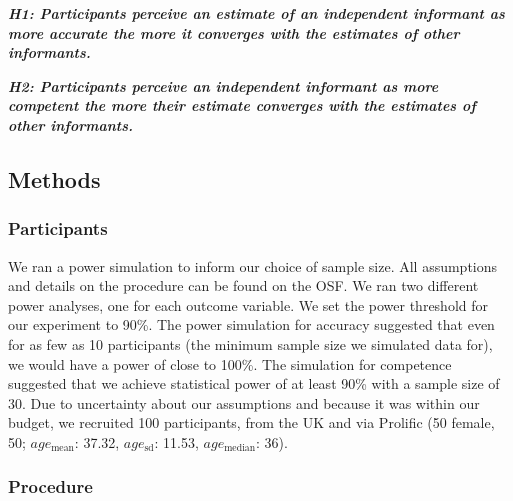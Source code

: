 \documentclass[
  doc,floatsintext]{apa6}
\begin{document}
\textbf{\emph{H1: Participants perceive an estimate of an independent informant as more accurate the more it converges with the estimates of other informants.}}

\textbf{\emph{H2: Participants perceive an independent informant as more competent the more their estimate converges with the estimates of other informants.}}

\subsection{Methods}\label{methods-3}

\subsubsection{Participants}\label{participants-3}

We ran a power simulation to inform our choice of sample size. All assumptions and details on the procedure can be found on the OSF. We ran two different power analyses, one for each outcome variable. We set the power threshold for our experiment to 90\%. The power simulation for accuracy suggested that even for as few as 10 participants (the minimum sample size we simulated data for), we would have a power of close to 100\%. The simulation for competence suggested that we achieve statistical power of at least 90\% with a sample size of 30. Due to uncertainty about our assumptions and because it was within our budget, we recruited 100 participants, from the UK and via Prolific (50 female, 50; \(age_\text{mean}\): 37.32, \(age_\text{sd}\): 11.53, \(age_\text{median}\): 36).

\subsubsection{Procedure}\label{procedure-2}
\end{document}
